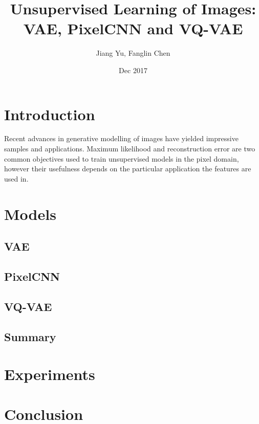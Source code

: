 \documentclass[11pt,a4paper]{article}
\begin{document}
\title{Unsupervised Learning of Images:\\VAE, PixelCNN and VQ-VAE}
\author{Jiang Yu, Fanglin Chen}
\date{Dec 2017}
\maketitle

\section{Introduction}
Recent advances in generative modelling of images have yielded impressive samples and applications. Maximum likelihood and reconstruction error are two common objectives used to train unsupervised models in the pixel domain, however their usefulness depends on the particular application the features are used in.

\section{Models}
\subsection{VAE}
\subsection{PixelCNN}
\subsection{VQ-VAE}
\subsection{Summary}

\section{Experiments}

\section{Conclusion}
\end{document}
